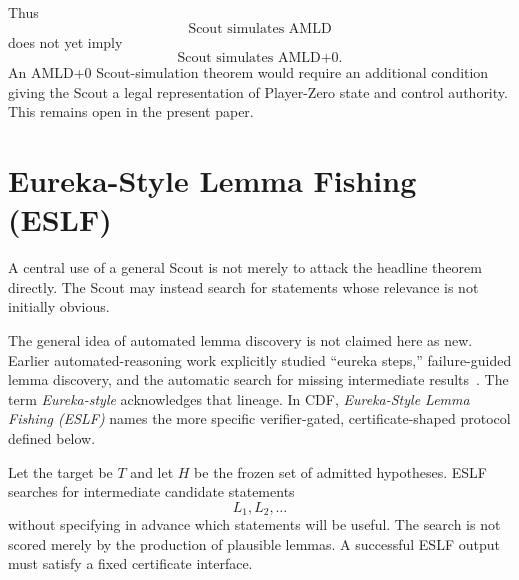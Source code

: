 \documentclass[11pt]{article}
\theoremstyle{definition}
\begin{document}
Thus
\[
\boxed{\text{Scout simulates AMLD}}
\]
does not yet imply
\[
\boxed{\text{Scout simulates AMLD+0}.}
\]
An AMLD+0 Scout-simulation theorem would require an additional condition giving the Scout a legal representation of Player-Zero state and control authority. This remains open in the present paper.


\section{Eureka-Style Lemma Fishing (ESLF)}

A central use of a general Scout is not merely to attack the headline theorem directly. The Scout may instead search for statements whose relevance is not initially obvious.

The general idea of automated lemma discovery is not claimed here as new. Earlier automated-reasoning work explicitly studied ``eureka steps,'' failure-guided lemma discovery, and the automatic search for missing intermediate results~\cite{bundy-eureka,ireland-bundy}. The term \emph{Eureka-style} acknowledges that lineage. In CDF, \emph{Eureka-Style Lemma Fishing (ESLF)} names the more specific verifier-gated, certificate-shaped protocol defined below.

Let the target be $T$ and let $H$ be the frozen set of admitted hypotheses. ESLF searches for intermediate candidate statements
\[
L_1,L_2,\ldots
\]
without specifying in advance which statements will be useful. The search is not scored merely by the production of plausible lemmas. A successful ESLF output must satisfy a fixed certificate interface.
\end{document}
